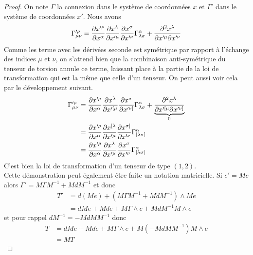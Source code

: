 \documentclass[a4paper,11pt]{report}
\theoremstyle{definition}
\theoremstyle{plain}
\theoremstyle{definition}
\theoremstyle{remark}
\begin{document}
                \begin{proof}
                    On note $\Gamma$ la connexion dans le système de coordonnées $x$ et $\Gamma'$ dans le système de coordonnées $x'$. Nous avons
                    \begin{equation}
                        \Gamma'^\rho_{\mu\nu} = \pdv{x'^\rho}{x^\alpha}\pdv{x^\lambda}{x'^\mu}\pdv{x^\sigma}{x'^\nu}\Gamma^\alpha_{\lambda\sigma}+\pdv{x^\lambda}{x'^\mu}{x'^\nu}
                    \end{equation}
                    Comme les terme avec les dérivées seconde est symétrique par rapport à l'échange des indices $\mu$ et $\nu$, on s'attend bien que la combinaison anti-symétrique du tenseur de torsion annule ce terme, laissant place à la partie de la loi de transformation qui est la même que celle d'un tenseur. On peut aussi voir cela par le développement suivant.
                    \begin{align}
                        \Gamma'^\rho_{\mu\nu} &= \pdv{x'^\rho}{x^\alpha}\pdv{x^\lambda}{x'^{[\mu}}\pdv{x^\sigma}{x'^{\nu]}}\Gamma^\alpha_{\lambda\sigma}+\underbrace{\pdv{x^\lambda}{x'^{[\mu}}{x'^{\nu]}}}_{0}\\
                        &= \pdv{x'^\rho}{x^\alpha}\pdv{x^{[\lambda}}{x'^{\mu}}\pdv{x^{\sigma]}}{x'^{\nu}}\Gamma^\alpha_{[\lambda\sigma]}\\
                        &= \pdv{x'^\rho}{x^\alpha}\pdv{x^{\lambda}}{x'^{\mu}}\pdv{x^{\sigma}}{x'^{\nu}}\Gamma^\alpha_{[\lambda\sigma]}
                    \end{align}
                    C'est bien la loi de transformation d'un tenseur de type $(1,2)$.\\ Cette démonstration peut également être faite un notation matricielle. Si $e' = Me$ alors $\Gamma' = M\Gamma M^{-1}+MdM^{-1}$ et donc
                    \begin{align}
                        T' &= d(Me) + (M\Gamma M^{-1}+MdM^{-1})\wedge Me\\
                        &= dM e + Mde + M\Gamma\wedge e + MdM^{-1}M\wedge e
                    \end{align}
                    et pour rappel $dM^{-1} = -MdMM^{-1}$ donc
                    \begin{align}
                        T &= dM e + Mde + M\Gamma\wedge e + M(-MdMM^{-1})M\wedge e\\
                        &= MT
                    \end{align}
                \end{proof}
                
\end{document}
